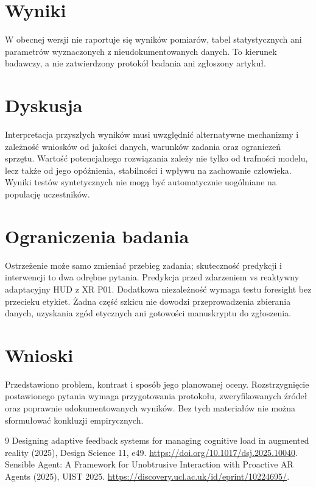 \documentclass[11pt,a4paper]{article}
\begin{document}
\section{Wyniki}

W obecnej wersji nie raportuje się wyników pomiarów, tabel statystycznych ani parametrów wyznaczonych z nieudokumentowanych danych. To kierunek badawczy, a nie zatwierdzony protokół badania ani zgłoszony artykuł.

\section{Dyskusja}

Interpretacja przyszłych wyników musi uwzględnić alternatywne mechanizmy i zależność wniosków od jakości danych, warunków zadania oraz ograniczeń sprzętu. Wartość potencjalnego rozwiązania zależy nie tylko od trafności modelu, lecz także od jego opóźnienia, stabilności i wpływu na zachowanie człowieka. Wyniki testów syntetycznych nie mogą być automatycznie uogólniane na populację uczestników.

\section{Ograniczenia badania}

Ostrzeżenie może samo zmieniać przebieg zadania; skuteczność predykcji i interwencji to dwa odrębne pytania. Predykcja przed zdarzeniem vs reaktywny adaptacyjny HUD z XR P01. Dodatkowa niezależność wymaga testu foresight bez przecieku etykiet. Żadna część szkicu nie dowodzi przeprowadzenia zbierania danych, uzyskania zgód etycznych ani gotowości manuskryptu do zgłoszenia.

\section{Wnioski}

Przedstawiono problem, kontrast i sposób jego planowanej oceny. Rozstrzygnięcie postawionego pytania wymaga przygotowania protokołu, zweryfikowanych źródeł oraz poprawnie udokumentowanych wyników. Bez tych materiałów nie można sformułować konkluzji empirycznych.

\begin{thebibliography}{9}
 Designing adaptive feedback systems for managing cognitive load in augmented reality (2025), Design Science 11, e49. \url{https://doi.org/10.1017/dsj.2025.10040}.
 Sensible Agent: A Framework for Unobtrusive Interaction with Proactive AR Agents (2025), UIST 2025. \url{https://discovery.ucl.ac.uk/id/eprint/10224695/}.
\end{thebibliography}
\end{document}
